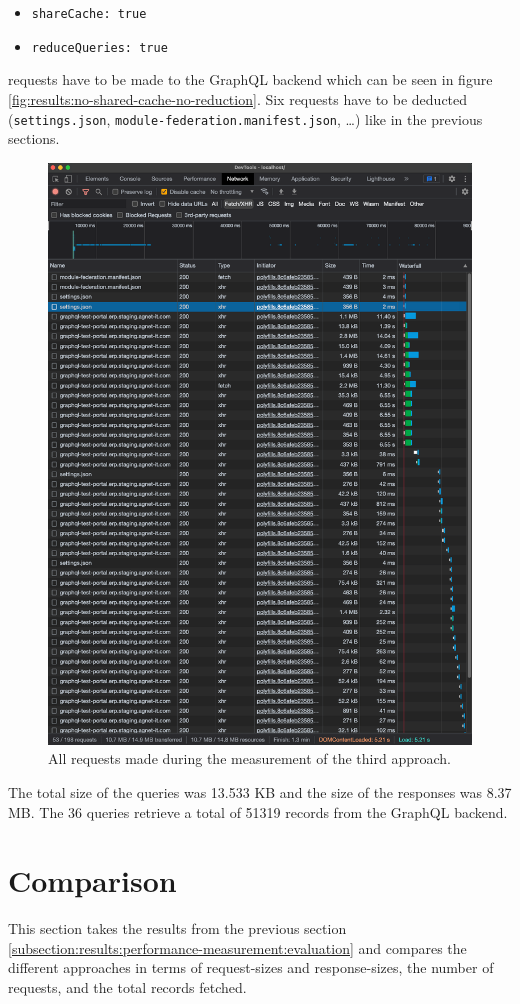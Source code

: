 \begin{itemize}
  \item \texttt{shareCache: true}
  \item \texttt{reduceQueries: true}
\end{itemize}

 requests have to be made to the GraphQL backend which can be seen in figure \ref{fig:results:no-shared-cache-no-reduction}. Six requests have to be deducted (\texttt{settings.json}, \texttt{module-federation.manifest.json}, \dots) like in the previous sections.

\ifshowImages
\begin{figure}[H]
\centering
\includegraphics[width=0.6\linewidth]{images/results/1-attempt/no-shared-cache-no-reduction.png}
\caption{All requests made during the measurement of the third approach.}\label{fig:results:shared-cache-reduction}
\end{figure}
\fi

\noindent The total size of the queries was 13.533 KB and the size of the responses was 8.37 MB. The 36 queries retrieve a total of 51319 records from the GraphQL backend.

\section{Comparison}\label{section:results:comparison}

This section takes the results from the previous section \ref{subsection:results:performance-measurement:evaluation} and compares the different approaches in terms of request-sizes and response-sizes, the number of requests, and the total records fetched.

